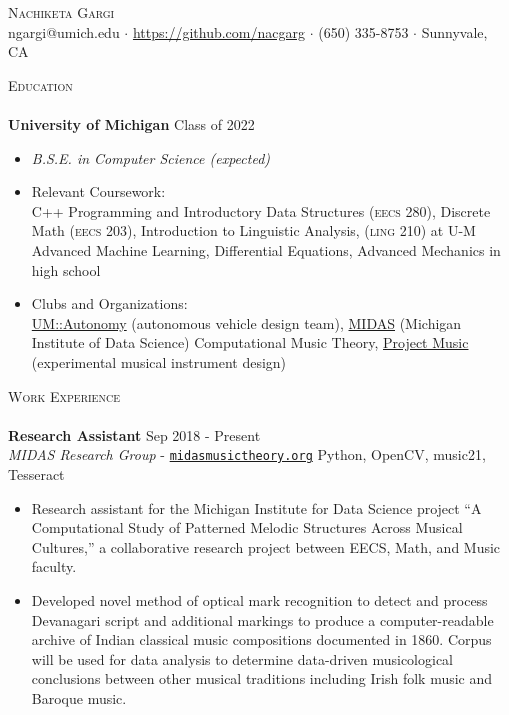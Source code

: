 \documentclass[11pt]{extarticle}
\newcommand{\lineunder} {
	\vspace*{-8pt} \\
	\hspace*{-18pt} \hrulefill \\
}
\newcommand{\header} [1] {
	{\hspace*{-18pt}\vspace*{6pt} \textsc{#1}}
	\vspace*{-6pt} \lineunder
}
\begin{document}
\vspace*{-30pt}
	

\begin{center}
	{\Huge \scshape {Nachiketa Gargi}}\\
	ngargi@umich.edu $\cdot$ \url{https://github.com/nacgarg} $\cdot$ (650) 335-8753 $\cdot$ Sunnyvale, CA \\
\end{center}
\noindent
\header{Education}
\noindent
\textbf{University of Michigan} \hfill Class of 2022
\vspace{-2mm}
\begin{itemize}
	\setlength{\itemindent}{-3mm}
	\item[] \textit{B.S.E. in Computer Science (expected)}\vspace{-3mm}
	\newline
	\vspace{-1mm}

	\item[] Relevant Coursework: \\ C++ Programming and Introductory Data Structures (\textsc{eecs 280}), Discrete Math (\textsc{eecs 203}), Introduction to Linguistic Analysis, (\textsc{ling 210}) at U-M \\ Advanced Machine Learning, Differential Equations, Advanced Mechanics in high school
	\item[] Clubs and Organizations:\\ \href{https://umautonomy.com/}{UM::Autonomy} (autonomous vehicle design team), \href{http://www.midasmusictheory.org/}{MIDAS} (Michigan Institute of Data Science) Computational Music Theory, \href{https://michiganprojectmusic.github.io/index.html}{Project Music} (experimental musical instrument design) 
\end{itemize}

\noindent
\header{Work Experience}
\noindent
\textbf{Research Assistant} \hfill Sep 2018 - Present\\
\textit{MIDAS Research Group} - \href{https://midasmusictheory.org}{\texttt{midasmusictheory.org}} \hfill Python, OpenCV, music21, Tesseract\\
\vspace{-6mm}
\begin{itemize} \itemsep 0.1pt
	\item Research assistant for the Michigan Institute for Data Science project “A Computational Study of Patterned Melodic Structures Across Musical Cultures,” a collaborative research project between EECS, Math, and Music faculty.
	\item Developed novel method of optical mark recognition to detect and process Devanagari script and additional markings to produce a computer-readable archive of Indian classical music compositions documented in 1860. Corpus will be used for data analysis to determine data-driven musicological conclusions between other musical traditions including Irish folk music and Baroque music. 
\end{itemize}
\end{document}
